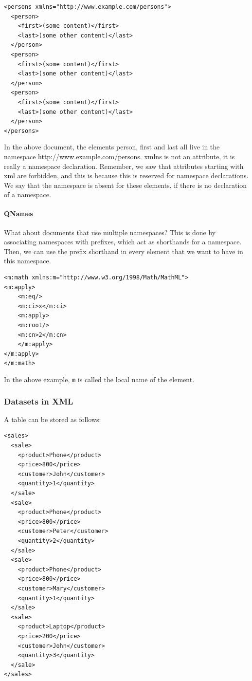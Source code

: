 \begin{lstlisting}[style=xml, caption={Example XML code}, label={lst:xml7}]
<persons xmlns="http://www.example.com/persons">
  <person>
    <first>(some content)</first>
    <last>(some other content)</last>
  </person>
  <person>
    <first>(some content)</first>
    <last>(some other content)</last>
  </person>
  <person>
    <first>(some content)</first>
    <last>(some other content)</last>
  </person>
</persons>
\end{lstlisting}
In the above document, the elements person, first and last all live in the namespace http://www.example.com/persons. xmlns is not an attribute, it is really a namespace declaration. Remember, we saw that attributes starting with xml are forbidden, and this is because this is reserved for namespace declarations. We say that the namespace is absent for these elements, if there is no declaration of a namespace.

\paragraph{QNames}
What about documents that use multiple namespaces? This is done by associating namespaces with prefixes, which act as shorthands for a namespace. Then, we can use the prefix shorthand in every element that we want to have in this namespace.

\begin{lstlisting}[style=xml, caption={Example XML code}, label={lst:xml8}]
<m:math xmlns:m="http://www.w3.org/1998/Math/MathML">
<m:apply>
    <m:eq/>
    <m:ci>x</m:ci>
    <m:apply>
    <m:root/>
    <m:cn>2</m:cn>
    </m:apply>
</m:apply>
</m:math>
\end{lstlisting}

In the above example, \texttt{m} is called the local name of the element.


\subsubsection{Datasets in XML}
A table can be stored as follows:

\begin{lstlisting}[style=xml, caption={Example XML code}, label={lst:xml9}]
<sales>
  <sale>
    <product>Phone</product>
    <price>800</price>
    <customer>John</customer>
    <quantity>1</quantity>
  </sale>
  <sale>
    <product>Phone</product>
    <price>800</price>
    <customer>Peter</customer>
    <quantity>2</quantity>
  </sale>
  <sale>
    <product>Phone</product>
    <price>800</price>
    <customer>Mary</customer>
    <quantity>1</quantity>
  </sale>
  <sale>
    <product>Laptop</product>
    <price>200</price>
    <customer>John</customer>
    <quantity>3</quantity>
  </sale>
</sales>
\end{lstlisting}

